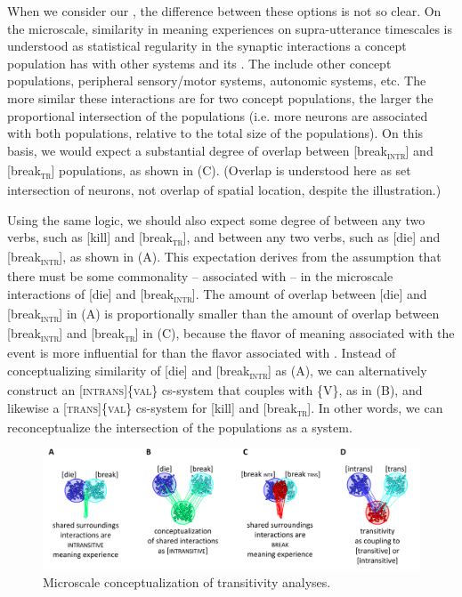   When we consider our , the difference between these options is not so clear. On the microscale, similarity in meaning experiences on supra-utterance timescales is understood as statistical regularity in the synaptic interactions a concept population has with other systems and its . The  include other concept populations, peripheral sensory/motor systems, autonomic systems, etc. The more similar these interactions are for two concept populations, the larger the proportional intersection of the populations (i.e. more neurons are associated with both populations, relative to the total size of the populations). On this basis, we would expect a substantial degree of overlap between [break\textsc{\textsubscript{intr}}] and [break\textsc{\textsubscript{tr}}] populations, as shown in {}(C). (Overlap is understood here as set intersection of neurons, not overlap of spatial location, despite the illustration.)

  Using the same logic, we should also expect some degree of  between any two  verbs, such as [kill] and [break\textsc{\textsubscript{tr}}], and between any two  verbs, such as [die] and [break\textsc{\textsubscript{intr}}], as shown in {}(A). This expectation derives from the assumption that there must be some commonality -- associated with  -- in the microscale  interactions of [die] and [break\textsc{\textsubscript{intr}}]. The amount of overlap between [die] and [break\textsc{\textsubscript{intr}}] in (A) is proportionally smaller than the amount of overlap between [break\textsc{\textsubscript{intr}}] and [break\textsc{\textsubscript{tr}}] in (C), because the flavor of meaning associated with the event is more influential for  than the flavor associated with . Instead of conceptualizing similarity of [die] and [break\textsc{\textsubscript{intr}}] as  (A), we can alternatively construct an [\textsc{intrans}]\{\textsc{val}\} cs-system that couples with \{V\}, as in (B), and likewise a [\textsc{trans}]\{\textsc{val}\} cs-system for [kill] and [break\textsc{\textsubscript{tr}}]. In other words, we can reconceptualize the intersection of the populations as a system.

  
\begin{figure}
\includegraphics[width=\textwidth]{figures/Tilsen-img73.png}
\caption{Microscale conceptualization of transitivity analyses.}
\label{fig:4:23}
\end{figure}
 

